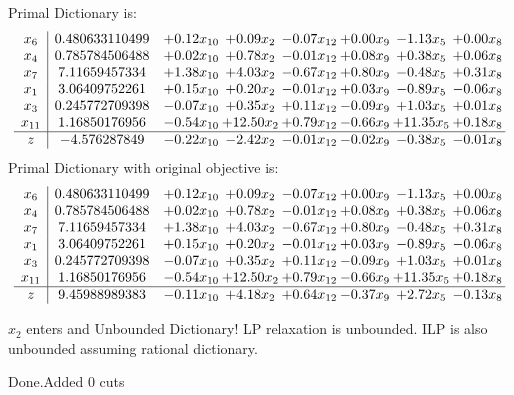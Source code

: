 \documentclass[8pt]{article}
\begin{document}
Primal Dictionary is:
\[\begin{array}{c| c c@{\hskip 2pt} c@{\hskip 2pt} c@{\hskip 2pt} c@{\hskip 2pt} c@{\hskip 2pt} c@{\hskip 2pt} }
 x_{6}   &  0.480633110499 & +  0.12 x_{10} & +  0.09 x_{2} & -0.07 x_{12} & +  0.00 x_{9} & -1.13 x_{5} & +  0.00 x_{8}\\
 x_{4}   &  0.785784506488 & +  0.02 x_{10} & +  0.78 x_{2} & -0.01 x_{12} & +  0.08 x_{9} & +  0.38 x_{5} & +  0.06 x_{8}\\
 x_{7}   &  7.11659457334 & +  1.38 x_{10} & +  4.03 x_{2} & -0.67 x_{12} & +  0.80 x_{9} & -0.48 x_{5} & +  0.31 x_{8}\\
 x_{1}   &  3.06409752261 & +  0.15 x_{10} & +  0.20 x_{2} & -0.01 x_{12} & +  0.03 x_{9} & -0.89 x_{5} & -0.06 x_{8}\\
 x_{3}   &  0.245772709398 & -0.07 x_{10} & +  0.35 x_{2} & +  0.11 x_{12} & -0.09 x_{9} & +  1.03 x_{5} & +  0.01 x_{8}\\
 x_{11}   &  1.16850176956 & -0.54 x_{10} & + 12.50 x_{2} & +  0.79 x_{12} & -0.66 x_{9} & + 11.35 x_{5} & +  0.18 x_{8}\\
\hline
z    &  -4.576287849 & -0.22 x_{10} & -2.42 x_{2} & -0.01 x_{12} & -0.02 x_{9} & -0.38 x_{5} & -0.01 x_{8}\\
\end{array}\]
Primal Dictionary with original objective is:
\[\begin{array}{c| c c@{\hskip 2pt} c@{\hskip 2pt} c@{\hskip 2pt} c@{\hskip 2pt} c@{\hskip 2pt} c@{\hskip 2pt} }
 x_{6}   &  0.480633110499 & +  0.12 x_{10} & +  0.09 x_{2} & -0.07 x_{12} & +  0.00 x_{9} & -1.13 x_{5} & +  0.00 x_{8}\\
 x_{4}   &  0.785784506488 & +  0.02 x_{10} & +  0.78 x_{2} & -0.01 x_{12} & +  0.08 x_{9} & +  0.38 x_{5} & +  0.06 x_{8}\\
 x_{7}   &  7.11659457334 & +  1.38 x_{10} & +  4.03 x_{2} & -0.67 x_{12} & +  0.80 x_{9} & -0.48 x_{5} & +  0.31 x_{8}\\
 x_{1}   &  3.06409752261 & +  0.15 x_{10} & +  0.20 x_{2} & -0.01 x_{12} & +  0.03 x_{9} & -0.89 x_{5} & -0.06 x_{8}\\
 x_{3}   &  0.245772709398 & -0.07 x_{10} & +  0.35 x_{2} & +  0.11 x_{12} & -0.09 x_{9} & +  1.03 x_{5} & +  0.01 x_{8}\\
 x_{11}   &  1.16850176956 & -0.54 x_{10} & + 12.50 x_{2} & +  0.79 x_{12} & -0.66 x_{9} & + 11.35 x_{5} & +  0.18 x_{8}\\
\hline
z    &  9.45988989383 & -0.11 x_{10} & +  4.18 x_{2} & +  0.64 x_{12} & -0.37 x_{9} & +  2.72 x_{5} & -0.13 x_{8}\\
\end{array}\]


 $ x_{2} $ enters and Unbounded Dictionary!
 LP relaxation is unbounded. ILP is also unbounded assuming rational dictionary. 

Done.Added 0 cuts 
\end{document}
